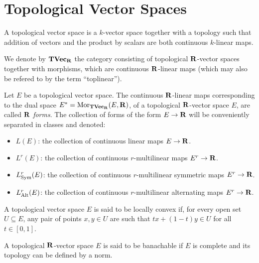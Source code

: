 \section{Topological Vector Spaces}

\begin{definition}
\label{def:topological-vector-space}
A topological vector space is a \(k\)-vector space together with a topology
such that addition of vectors and the product by scalars are both continuous
\(k\)-linear maps.

We denote by \({\textbf{TVec}}_{\mathbf{R}}\) the category consisting of topological
\(\mathbf{R}\)-vector spaces together with morphisms, which are continuous \(\mathbf{R}\)-linear
maps (which may also be refered to by the term ``toplinear'').

Let \(E\) be a topological vector space. The continuous \(\mathbf{R}\)-linear maps
corresponding to the dual space \(E^{*} = \operatorname{Mor}_{{\textbf{TVec}}_{\mathbf{R}}}(E, \mathbf{R})\), of a
topological \(\mathbf{R}\)-vector space \(E\), are called \(\mathbf{R}\) \emph{forms}. The
collection of forms of the form \(E \to \mathbf{R}\) will be conveniently separated in
classes and denoted:
\begin{itemize}\setlength\itemsep{0em}
\item \(L(E)\): the collection of continuous linear maps \(E \to \mathbf{R}\).
\item \(L^r(E)\): the collection of continuous \(r\)-multilinear maps \(E^r \to \mathbf{R}\).
\item \(L^r_{\operatorname{Sym}}(E)\): the collection of continuous \(r\)-multilinear
  symmetric maps \(E^r \to \mathbf{R}\).
\item \(L^r_{\operatorname{Alt}}(E)\): the collection of continuous \(r\)-multilinear
  alternating maps \(E^r \to \mathbf{R}\).
\end{itemize}
\end{definition}

\begin{definition}
\label{def:locally-convex}
A topological vector space \(E\) is said to be locally convex if, for every open
set \(U \subseteq E\), any pair of points \(x, y \in U\) are such that \(t x +
(1 - t) y \in U\) for all \(t \in [0, 1]\).
\end{definition}

\begin{definition}[Banachable]
\label{def:banachable}
A topological \(\mathbf{R}\)-vector space \(E\) is said to be banachable if \(E\) is
complete and its topology can be defined by a norm.
\end{definition}

